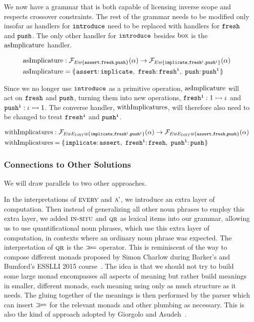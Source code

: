 We now have a grammar that is both capable of licensing inverse scope and
respects crossover constraints. The rest of the grammar needs to be
modified only insofar as handlers for $\mathtt{introduce}$ need to be replaced
with handlers for $\mathtt{fresh}$ and $\mathtt{push}$. The only other handler for
$\mathtt{introduce}$ besides $\mathrm{box}$ is the $\operatorname{asImplicature}$ handler.

\begin{align*}
  \asImplicature &: \FF_{E \uplus \{\op{assert},\op{fresh},\op{push}\}}(\alpha) \to
                    \FF_{E \uplus \{\op{implicate},\op{fresh^i},\op{push^i}\}}(\alpha) \\
  \asImplicature &= \banana{\onto{\op{assert}}{\op{implicate}},\
                            \onto{\op{fresh}}{\op{fresh^i}},\
                            \onto{\op{push}}{\op{push^i}}}
\end{align*}

Since we no longer use $\mathtt{introduce}$ as a primitive operation,
$\operatorname{asImplicature}$ will act on $\mathtt{fresh}$ and $\mathtt{push}$, turning them
into new operations, $\mathtt{fresh^i} : 1 \rightarrowtail \iota$ and
$\mathtt{push^i} : \iota \rightarrowtail 1$. The converse handler, $\operatorname{withImplicatures}$,
will therefore also need to be changed to treat $\mathtt{fresh^i}$ and
$\mathtt{push^i}$.

\begin{align*}
  \withImplicatures &: \FF_{E \uplus E_\DRT \uplus \{\op{implicate},\op{fresh^i},\op{push^i}\}}(\alpha) \to
                       \FF_{E \uplus E_\DRT \uplus \{\op{assert},\op{fresh},\op{push}\}}(\alpha) \\
  \withImplicatures &= \banana{\onto{\op{implicate}}{\op{assert}},\
                               \onto{\op{fresh^i}}{\op{fresh}},\
                               \onto{\op{push^i}}{\op{push}}}
\end{align*}


\subsubsection{Connections to Other Solutions}

We will draw parallels to two other approaches.

In the interpretations of $\textsc{every}$ and $\textsc{a'}$, we introduce an
extra layer of computation. Then instead of generalizing all other noun
phrases to employ this extra layer, we added $\textsc{in-situ}$ and $\textsc{qr}$
as lexical items into our grammar, allowing us to use quantificational noun
phrases, which use this extra layer of computation, in contexts where an
ordinary noun phrase was expected. The interpretation of $\textsc{qr}$ is the
$\mathbin{\gg\!=}$ operator. This is reminiscent of the way to compose different
monads proposed by Simon Charlow during Barker's and Bumford's ESSLLI 2015
course~\cite{barker2015monads}. The idea is that we should not try to build
some large monad encompasses all aspects of meaning but rather build
meanings in smaller, different monads, each meaning using only as much
structure as it needs. The gluing together of the meanings is then
performed by the parser which can insert $\mathbin{\gg\!=}$ for the relevant monads
and other plumbing as necessary. This is also the kind of approach adopted
by Giorgolo and Asudeh~\cite{giorgolo2015natural}.

